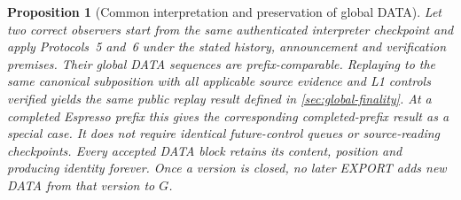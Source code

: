 \documentclass[11pt,a4paper]{article}
\newtheorem{proposition}[proposition]{Proposition}
\begin{document}
\begin{proposition}[Common interpretation and preservation of global DATA]
\label{prop:global-prefix}
Let two correct observers start from the same authenticated interpreter
checkpoint and apply Protocols~5 and~6 under the stated history,
announcement and verification premises. Their global DATA sequences are
prefix-comparable. Replaying to the same canonical subposition with all applicable source
evidence and L1 controls verified yields the same public replay result
defined in \cref{sec:global-finality}. At a completed Espresso prefix
this gives the corresponding completed-prefix result as a special case. It does not require identical
future-control queues or source-reading checkpoints. Every accepted DATA
block retains its content,
position and producing identity forever. Once a version is closed, no
later EXPORT adds new DATA from that version to $G$.
\end{proposition}
\end{document}
